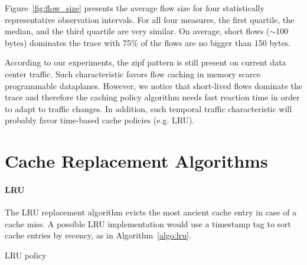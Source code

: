 Figure~\ref{fig:flow_size} presents the average flow size for four statistically representative observation intervals.
For all four measures, the first quartile, the median, and the third quartile are very similar.
On average, short flows ($\sim$100 bytes) dominates the trace with 75\% of the flows are no bigger than 150 bytes.

According to our experiments, the zipf pattern is still present on current data center traffic.
Such characteristic favors flow caching in memory scarce programmable dataplanes.
However, we notice that short-lived flows dominate the trace and therefore the caching policy algorithm needs fast reaction time in order to adapt to traffic changes.
In addition, such temporal traffic characteristic will probably favor time-based cache policies (e.g. LRU).

\section{Cache Replacement Algorithms}\label{sec:policies}

\paragraph{LRU}
The LRU replacement algorithm evicts the most ancient cache entry in case of a cache miss.
A possible LRU implementation would use a timestamp tag to sort cache entries by recency, as in Algorithm~\ref{algo:lru}.

\begin{algorithm}[]
	\caption{LRU policy}
	\label{algo:lru}
	\SetInd{0.1em}{.9em}
	\SetAlgoLined
	\footnotesize
\end{algorithm}

